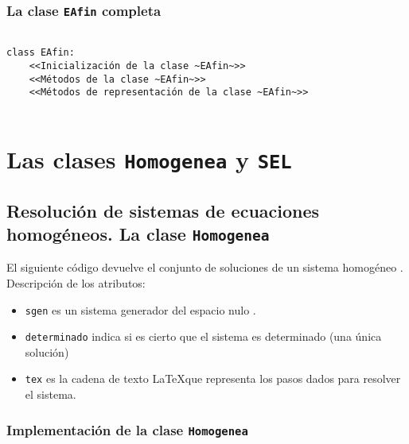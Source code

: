 \documentclass[11pt]{report}
\begin{document}
\section{La clase \texttt{EAfin} completa}
\label{sec:org3fcdb9b}

\begin{verbatim}

class EAfin:
    <<Inicialización de la clase ~EAfin~>>
    <<Métodos de la clase ~EAfin~>>
    <<Métodos de representación de la clase ~EAfin~>>
    
\end{verbatim}


\part{Las clases \texttt{Homogenea} y  \texttt{SEL}}
\label{sec:orgc0f1253}


\chapter{Resolución de sistemas de ecuaciones homogéneos. La clase  \texttt{Homogenea}}
\label{sec:orgf0ea2cf}

El siguiente código devuelve el conjunto de soluciones de un sistema homogéneo . Descripción de los atributos:
\begin{itemize}
\item \texttt{sgen} es un sistema generador del espacio nulo .
\item \texttt{determinado} indica si es cierto que el sistema es determinado (una única solución)
\item \texttt{tex} es la cadena de texto \LaTeX que representa los pasos dados
para resolver el sistema.
\end{itemize}

\section{Implementación de la clase \texttt{Homogenea}}
\label{sec:org1e72d24}
\end{document}
